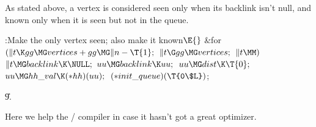 As stated above, a vertex is considered seen only when its backlink
isn't null, and known only when it is seen but not in the queue.

\Y\B\4:Make  the only vertex seen; also make it known\X${}\E{}$\6
\&{for} ${}(\|t\K\\{gg}\MG\\{vertices}+\\{gg}\MG\|n-\T{1};{}$ ${}\|t\G\\{gg}\MG%
\\{vertices};{}$ ${}\|t\MM){}$\1\5
${}\|t\MG\\{backlink}\K\NULL;{}$\2\6
${}\\{uu}\MG\\{backlink}\K\\{uu};{}$\6
${}\\{uu}\MG\\{dist}\K\T{0};{}$\6
${}\\{uu}\MG\\{hh\_val}\K({*}\\{hh})(\\{uu});{}$\6
${}({*}\\{init\_queue})(\T{0\$L}){}$;\par
\U9.\fi

Here we help the \CEE/ compiler in case it hasn't got a great optimizer.

